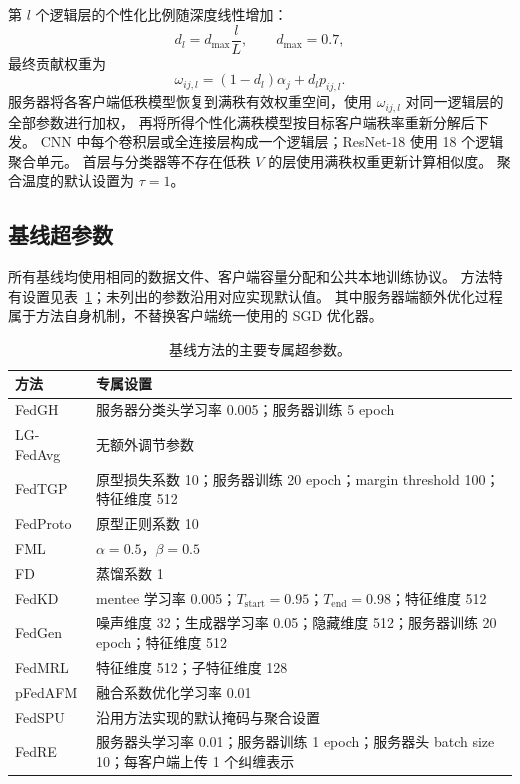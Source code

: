 第 $l$ 个逻辑层的个性化比例随深度线性增加：
\begin{equation}
d_l=d_{\max}\frac{l}{L},\qquad d_{\max}=0.7,
\end{equation}
最终贡献权重为
\begin{equation}
\omega_{ij,l}=(1-d_l)\alpha_j+d_lp_{ij,l}.
\end{equation}
服务器将各客户端低秩模型恢复到满秩有效权重空间，使用 $\omega_{ij,l}$ 对同一逻辑层的全部参数进行加权，
再将所得个性化满秩模型按目标客户端秩率重新分解后下发。
CNN 中每个卷积层或全连接层构成一个逻辑层；ResNet-18 使用 18 个逻辑聚合单元。
首层与分类器等不存在低秩 $V$ 的层使用满秩权重更新计算相似度。
聚合温度的默认设置为 $\tau=1$。

\subsection{基线超参数}

所有基线均使用相同的数据文件、客户端容量分配和公共本地训练协议。
方法特有设置见表~\ref{tab:appendix_baseline_hparams}；未列出的参数沿用对应实现默认值。
其中服务器端额外优化过程属于方法自身机制，不替换客户端统一使用的 SGD 优化器。

\begin{table}[t]
\centering
\caption{基线方法的主要专属超参数。}
\label{tab:appendix_baseline_hparams}
\small
\setlength{\tabcolsep}{5pt}
\renewcommand{\arraystretch}{1.12}
\begin{tabularx}{\textwidth}{@{}lX@{}}
\toprule
\textbf{方法} & \textbf{专属设置} \\
\midrule
FedGH & 服务器分类头学习率 0.005；服务器训练 5 epoch \\
LG-FedAvg & 无额外调节参数 \\
FedTGP & 原型损失系数 10；服务器训练 20 epoch；margin threshold 100；特征维度 512 \\
FedProto & 原型正则系数 10 \\
FML & $\alpha=0.5$，$\beta=0.5$ \\
FD & 蒸馏系数 1 \\
FedKD & mentee 学习率 0.005；$T_{\mathrm{start}}=0.95$；$T_{\mathrm{end}}=0.98$；特征维度 512 \\
FedGen & 噪声维度 32；生成器学习率 0.05；隐藏维度 512；服务器训练 20 epoch；特征维度 512 \\
FedMRL & 特征维度 512；子特征维度 128 \\
pFedAFM & 融合系数优化学习率 0.01 \\
FedSPU & 沿用方法实现的默认掩码与聚合设置 \\
FedRE & 服务器头学习率 0.01；服务器训练 1 epoch；服务器头 batch size 10；每客户端上传 1 个纠缠表示 \\
\bottomrule
\end{tabularx}
\end{table}

